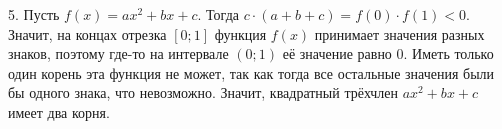 5. Пусть $f(x)=ax^2+bx+c.$ Тогда $c\cdot(a+b+c)=f(0)\cdot f(1)<0.$ Значит, на концах отрезка $[0;1]$ функция $f(x)$ принимает значения разных знаков, поэтому где-то на интервале $(0;1)$ её значение равно 0. Иметь только один корень эта функция не может, так как тогда все остальные значения были бы одного знака, что невозможно. Значит, квадратный трёхчлен $ax^2+bx+c$ имеет два корня.\\
